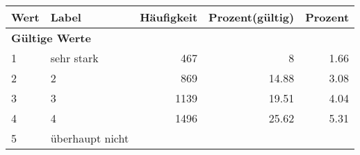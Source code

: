      \begin{longtable}{lXrrr}
     \toprule
     \textbf{Wert} & \textbf{Label} & \textbf{Häufigkeit} & \textbf{Prozent(gültig)} & \textbf{Prozent} \\
     \endhead
     \midrule
     \multicolumn{5}{l}{\textbf{Gültige Werte}}\\

     1 &
     \multicolumn{1}{X}{ sehr stark   } &


       \num{467} &
       \num[round-mode=places,round-precision=2]{8} &
         \num[round-mode=places,round-precision=2]{1,66} \\

     2 &
     \multicolumn{1}{X}{ 2   } &


       \num{869} &
       \num[round-mode=places,round-precision=2]{14,88} &
         \num[round-mode=places,round-precision=2]{3,08} \\

     3 &
     \multicolumn{1}{X}{ 3   } &


       \num{1139} &
       \num[round-mode=places,round-precision=2]{19,51} &
         \num[round-mode=places,round-precision=2]{4,04} \\

     4 &
     \multicolumn{1}{X}{ 4   } &


       \num{1496} &
       \num[round-mode=places,round-precision=2]{25,62} &
         \num[round-mode=places,round-precision=2]{5,31} \\

     5 &
     \multicolumn{1}{X}{ überhaupt nicht   } &



\end{longtable}
